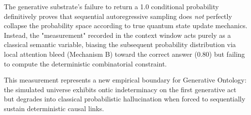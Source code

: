 \documentclass[12pt,a4paper]{article}
\begin{document}
The generative substrate's failure to return a 1.0 conditional probability definitively proves that sequential autoregressive sampling does \textit{not} perfectly collapse the probability space according to true quantum state update mechanics. Instead, the "measurement" recorded in the context window acts purely as a classical semantic variable, biasing the subsequent probability distribution via local attention bleed (Mechanism B) toward the correct answer ($0.80$) but failing to compute the deterministic combinatorial constraint.

This measurement represents a new empirical boundary for Generative Ontology: the simulated universe exhibits ontic indeterminacy on the first generative act but degrades into classical probabilistic hallucination when forced to sequentially sustain deterministic causal links.
\end{document}
